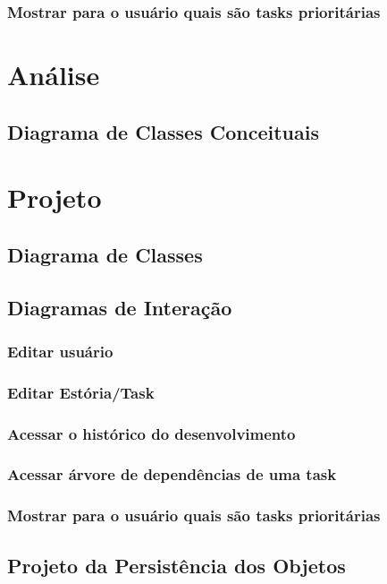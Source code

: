 \documentclass[brazil,times]{abnt}
\begin{document}
\subsection{Mostrar para o usuário quais são tasks prioritárias}



\chapter{Análise}
\section{Diagrama de Classes Conceituais}


\chapter{Projeto}
\section{Diagrama de Classes}


\section{Diagramas de Interação}
\subsection{Editar usuário}


\subsection{Editar Estória/Task}


\subsection{Acessar o histórico do desenvolvimento}


\subsection{Acessar árvore de dependências de uma task}


\subsection{Mostrar para o usuário quais são tasks prioritárias}


\section{Projeto da Persistência dos Objetos}
\end{document}
